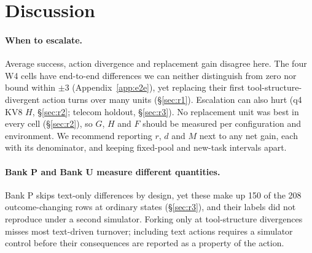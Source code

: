 \section{Discussion}
\label{sec:discussion}

\paragraph{When to escalate.} Average success, action divergence and replacement gain disagree here. The four W4 cells have end-to-end differences we can neither distinguish from zero nor bound within $\pm$3\pp{} (Appendix~\ref{app:e2e}), yet replacing their first tool-structure-divergent action turns over many units (\S\ref{sec:r1}). Escalation can also hurt (q4 KV8 $H$, \S\ref{sec:r2}; telecom holdout, \S\ref{sec:r3}). No replacement unit was best in every cell (\S\ref{sec:r2}), so $G$, $H$ and $F$ should be measured per configuration and environment.  We recommend reporting $r$, $d$ and $M$ next to any net gain, each with its denominator, and keeping fixed-pool and new-task intervals apart. %

\paragraph{Bank P and Bank U measure different quantities.} Bank P skips text-only differences by design, yet these make up 150 of the 208 outcome-changing rows at ordinary states (\S\ref{sec:r3}), and their labels did not reproduce under a second simulator. Forking only at tool-structure divergences misses most text-driven turnover; including text actions requires a simulator control before their consequences are reported as a property of the action. %
